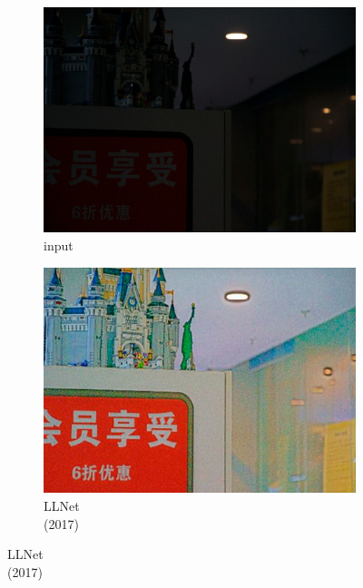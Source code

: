 \documentclass[letterpaper,12pt]{article}
\begin{document}
			\begin{figure}[htbp] 
				\centering 
				\begin{subfigure}{0.19\textwidth}
					\includegraphics[width=\linewidth]{VE-LOL-L/input}
					\captionsetup{font=scriptsize}
					\caption{input \\ \quad }
					\label{fig: input}
				\end{subfigure}
				\begin{subfigure}{0.19\textwidth}
					\includegraphics[width=\linewidth]{VE-LOL-L/RetinexNet}
					\captionsetup{font=scriptsize}
					\caption{LLNet\\ (2017)}
					\label{fig: LLNet}	
				\end{subfigure}

\end{figure}
\end{document}

